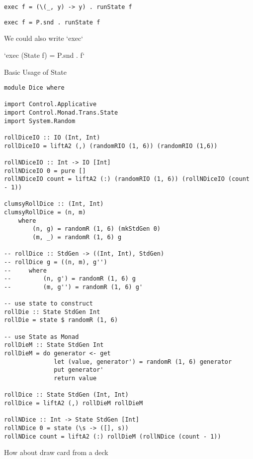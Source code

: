 \begin{verbatim}
exec f = (\(_, y) -> y) . runState f
\end{verbatim}


\begin{verbatim}
exec f = P.snd . runState f
\end{verbatim}

We could also write `exec`

`exec (State f) = P.snd . f`


 Basic Usage of State

\begin{verbatim}
module Dice where

import Control.Applicative
import Control.Monad.Trans.State
import System.Random

rollDiceIO :: IO (Int, Int)
rollDiceIO = liftA2 (,) (randomRIO (1, 6)) (randomRIO (1,6))

rollNDiceIO :: Int -> IO [Int]
rollNDiceIO 0 = pure []
rollNDiceIO count = liftA2 (:) (randomRIO (1, 6)) (rollNDiceIO (count - 1))

clumsyRollDice :: (Int, Int)
clumsyRollDice = (n, m)
    where
        (n, g) = randomR (1, 6) (mkStdGen 0)
        (m, _) = randomR (1, 6) g

-- rollDice :: StdGen -> ((Int, Int), StdGen)
-- rollDice g = ((n, m), g'')
--     where
--         (n, g') = randomR (1, 6) g
--         (m, g'') = randomR (1, 6) g'

-- use state to construct
rollDie :: State StdGen Int
rollDie = state $ randomR (1, 6)

-- use State as Monad
rollDieM :: State StdGen Int
rollDieM = do generator <- get
              let (value, generator') = randomR (1, 6) generator
              put generator'
              return value

rollDice :: State StdGen (Int, Int)
rollDice = liftA2 (,) rollDieM rollDieM

rollNDice :: Int -> State StdGen [Int]
rollNDice 0 = state (\s -> ([], s))
rollNDice count = liftA2 (:) rollDieM (rollNDice (count - 1))
\end{verbatim}

How about draw card from a deck

